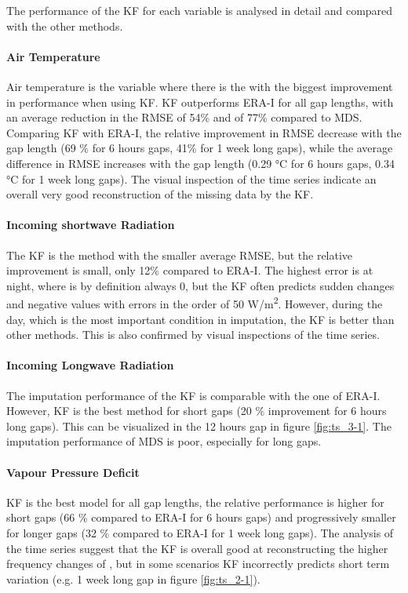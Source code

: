 \documentclass{article}
\begin{document}
The performance of the KF for each variable is analysed in detail and compared with the other methods.

\paragraph{Air Temperature} Air temperature is the variable where there is the with the biggest improvement in performance when using KF. KF outperforms ERA-I for all gap lengths, with an average reduction in the RMSE of 54\% and of 77\% compared to MDS. Comparing KF with ERA-I, the relative improvement in RMSE decrease with the gap length (69 \% for 6 hours gaps, 41\% for 1 week long gaps), while the average difference in RMSE increases with the gap length (0.29 °C  for 6 hours gaps, 0.34 °C for 1 week long gaps).
The visual inspection of the time series indicate an overall very good reconstruction of the missing data by the KF. 

\paragraph{Incoming shortwave Radiation} The KF is the method with the smaller average RMSE, but the relative improvement is small, only 12\% compared to ERA-I. The highest error is at night, where  is by definition always 0, but the KF often predicts sudden changes and negative values with errors in the order of 50 \si{W/m^2}. However, during the day, which is the most important condition in  imputation, the KF is better than other methods. This is also confirmed by visual inspections of the time series.

\paragraph{Incoming Longwave Radiation} The imputation performance of the KF is comparable with the one of ERA-I. However, KF is the best method for short gaps (20 \% improvement for 6 hours long gaps). This can be visualized in the 12 hours gap in figure \ref{fig:ts_3-1}. The imputation performance of MDS is poor, especially for long gaps.

\paragraph{Vapour Pressure Deficit} KF is the best model for all gap lengths, the relative performance is higher for short gaps (66 \% compared to ERA-I for 6 hours gaps) and progressively smaller for longer gaps (32 \% compared to ERA-I for 1 week long gaps). The analysis of the time series suggest that the KF is overall good at reconstructing the higher frequency changes of , but in some scenarios KF incorrectly predicts short term variation (e.g. 1 week long gap in figure \ref{fig:ts_2-1}).
\end{document}
